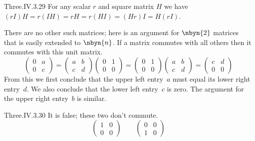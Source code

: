 \begin{ans}{Three.IV.3.29}
      For any scalar \( r \) and square matrix \( H \) we have
      \( (rI)H=r(IH)=rH=r(HI)=(Hr)I=H(rI) \).

      There are no other such matrices; here is an argument for $\nbyn{2}$
      matrices that is easily extended to $\nbyn{n}$.
      If a matrix commutes with all others then it commutes with this
      unit matrix.
      \begin{equation*}
        \begin{pmatrix}
          0  &a  \\
          0  &c
        \end{pmatrix}
        =\begin{pmatrix}
          a  &b  \\
          c  &d
        \end{pmatrix}
        \begin{pmatrix}
          0  &1  \\
          0  &0
        \end{pmatrix}
        =\begin{pmatrix}
          0  &1  \\
          0  &0
        \end{pmatrix}
        \begin{pmatrix}
          a  &b  \\
          c  &d
        \end{pmatrix}
        =\begin{pmatrix}
          c  &d  \\
          0  &0
        \end{pmatrix}
      \end{equation*}
      From this we first conclude that the upper left entry~$a$
      must equal its lower right entry~$d$.
      We also conclude that the lower left entry~$c$ is zero.
      The argument for the upper right entry~$b$ is similar.
    
\end{ans}
\begin{ans}{Three.IV.3.30}
      It is false; these two don't commute.
      \begin{equation*}
         \begin{pmatrix}
           1  &0  \\
           0  &0
         \end{pmatrix}
         \qquad
         \begin{pmatrix}
           0  &0  \\
           1  &0
         \end{pmatrix}
      \end{equation*}
    
\end{ans}
